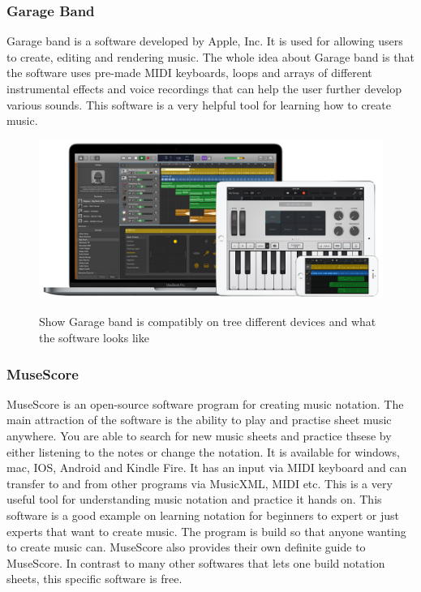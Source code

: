 \subsubsection{Garage Band}
Garage band is a software developed by Apple, Inc. It is used for allowing users to create, editing and rendering music. The whole idea about Garage band is that the software uses pre-made MIDI keyboards, loops and arrays of different instrumental effects and voice recordings that can help the user further develop various sounds. This software is a very helpful tool for learning how to create music.
\begin{figure}[H]
	\centering
	\includegraphics[width=0.7\linewidth]{figure/Analysis/garageband}
	\label{fig:garageband}
	\caption{Show Garage band is compatibly on tree different devices and what the software looks like}
	
\end{figure}


\subsubsection{MuseScore}
MuseScore is an open-source software program for creating music notation. The main attraction of the software is the ability to play and practise sheet music anywhere. You are able to search for new music sheets and practice thsese by either listening to the notes or change the notation. It is available for windows, mac, IOS, Android and Kindle Fire. It has an input via MIDI keyboard and can transfer to and from other programs via MusicXML, MIDI etc. This is a very useful tool for understanding music notation and practice it hands on. This software is a good example on learning notation for beginners to expert or just experts that want to create music. The program is build so that anyone wanting to create music can. MuseScore also provides their own definite guide to MuseScore. In contrast to many other softwares that lets one build notation sheets, this specific software is free. 

